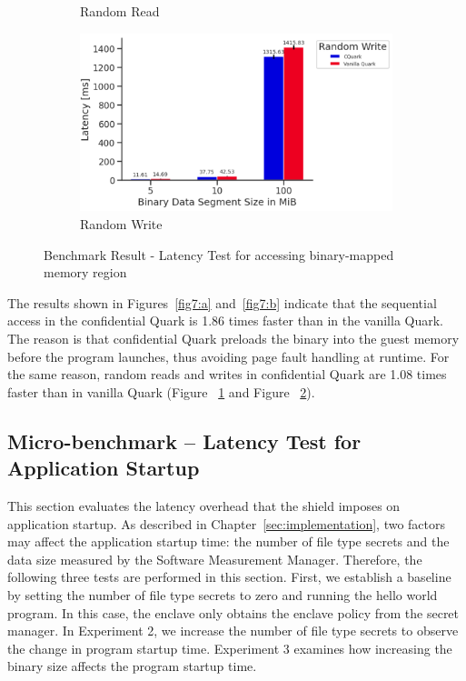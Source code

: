 \begin{figure}[!htb]
\begin{subfigure}[b]{0.5\linewidth}
      \caption{Random Read} 
      \label{fig7:c} 
    \end{subfigure}%
    \begin{subfigure}[b]{0.5\linewidth}
      \centering
      \includegraphics[width=0.9\linewidth]{images/Random_Write.PNG} 
      \caption{Random Write} 
      \label{fig7:d} 
    \end{subfigure} 
    \caption{Benchmark Result - Latency Test for accessing binary-mapped memory region}
    \label{fig7} 
\end{figure}



The results shown in Figures~\ref{fig7:a} and~\ref{fig7:b} indicate that the sequential access in the confidential Quark is 1.86 times faster than in the vanilla Quark. The reason is that confidential Quark preloads the binary into the guest memory before the program launches, thus avoiding page fault handling at 
runtime. For the same reason, random reads and writes in confidential Quark are 1.08 times faster than in vanilla Quark (Figure ~\ref{fig7:c} and Figure ~\ref{fig7:d}).


\subsection{Micro-benchmark – Latency Test for Application Startup}\label{micro_app_start_up}

This section evaluates the latency overhead that the shield imposes on application startup. As described in Chapter~\ref{sec:implementation}, two factors may affect the application startup time: the number of file type secrets and the data size measured by the Software Measurement Manager. Therefore, 
the following three tests are performed in this section. First, we establish a baseline by setting the number of file type secrets to zero and running the hello world program. In this case, the enclave only obtains the enclave policy from the secret manager. In Experiment 2, we increase the number of 
file type secrets to observe the change in program startup time. Experiment 3 examines how increasing the binary size affects the program startup time.

